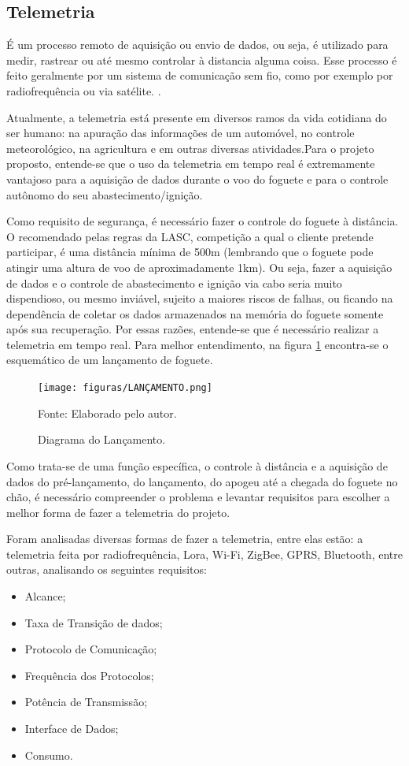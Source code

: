 \subsection{Telemetria}
\par É um processo remoto de aquisição ou envio de dados, ou seja, é utilizado para medir, rastrear ou até mesmo controlar à distancia alguma coisa. Esse processo é feito geralmente por um sistema de comunicação sem fio, como por exemplo por radiofrequência ou via satélite. \cite{Telemetria_AERONALTICA}.
\par Atualmente,  a telemetria está presente em diversos ramos da vida cotidiana do ser humano: na apuração das informações de um automóvel, no controle meteorológico, na agricultura e em outras diversas atividades.Para o projeto proposto, entende-se que o uso da telemetria em tempo real é extremamente vantajoso para a aquisição de dados durante o voo do foguete e para o controle autônomo do seu abastecimento/ignição.
\par Como requisito de segurança, é necessário fazer o controle  do foguete à distância. O recomendado pelas regras da LASC, competição a qual o cliente pretende participar, é uma distância mínima de 500m (lembrando que o foguete pode atingir uma altura de voo de aproximadamente 1km). Ou seja, fazer a aquisição de dados e o controle de abastecimento e ignição via cabo seria muito dispendioso, ou mesmo inviável, sujeito a maiores riscos de falhas, ou ficando na dependência de coletar os dados armazenados na memória do foguete somente após sua recuperação. Por essas razões, entende-se que é necessário realizar a telemetria em tempo real. Para melhor entendimento, na figura \ref{fig:Diagrama lançamento}   encontra-se o esquemático de um lançamento de foguete.
\begin{figure}[!htb]
\centering
\texttt{[image: figuras/LANÇAMENTO.png]}
\caption{Diagrama do Lançamento.}
{\footnotesize Fonte: Elaborado pelo autor.}
\label{fig:Diagrama lançamento}
\end{figure}

\par Como trata-se de uma função específica, o controle à distância e a aquisição de dados do pré-lançamento, do lançamento, do apogeu até a chegada do foguete no chão, é necessário compreender o problema e levantar requisitos para escolher a melhor forma de fazer a telemetria do projeto.
\par Foram analisadas diversas formas de fazer a telemetria, entre elas estão: a telemetria feita por radiofrequência, Lora, Wi-Fi, ZigBee, GPRS, Bluetooth, entre outras, analisando os seguintes requisitos: 
\begin{itemize}

\item Alcance;
\item Taxa de Transição de dados;
\item Protocolo de Comunicação;
\item Frequência dos Protocolos;
\item Potência de Transmissão; 
\item Interface de Dados;
\item Consumo.

\end{itemize}

